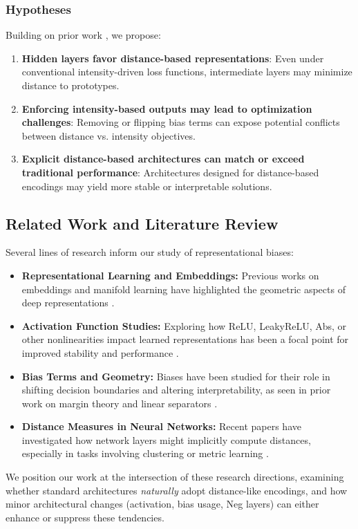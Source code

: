 \documentclass{article}
\begin{document}
\subsubsection{Hypotheses}
Building on prior work \cite{oursland2024,bishop2006pattern}, we propose:
\begin{enumerate}
    \item \textbf{Hidden layers favor distance-based representations}: Even under conventional intensity-driven loss functions, intermediate layers may minimize distance to prototypes.
    \item \textbf{Enforcing intensity-based outputs may lead to optimization challenges}: Removing or flipping bias terms can expose potential conflicts between distance vs. intensity objectives.
    \item \textbf{Explicit distance-based architectures can match or exceed traditional performance}: Architectures designed for distance-based encodings may yield more stable or interpretable solutions.
\end{enumerate}

\subsection{Related Work and Literature Review}
Several lines of research inform our study of representational biases:
\begin{itemize}
    \item \textbf{Representational Learning and Embeddings:} Previous works on embeddings and manifold learning have highlighted the geometric aspects of deep representations \cite{bishop2006pattern, jolliffe2002pca}. 
    \item \textbf{Activation Function Studies:} Exploring how ReLU, LeakyReLU, Abs, or other nonlinearities impact learned representations has been a focal point for improved stability and performance \cite{nair2010rectified}.
    \item \textbf{Bias Terms and Geometry:} Biases have been studied for their role in shifting decision boundaries and altering interpretability, as seen in prior work on margin theory and linear separators \cite{lipton2018mythos}.
    \item \textbf{Distance Measures in Neural Networks:} Recent papers have investigated how network layers might implicitly compute distances, especially in tasks involving clustering or metric learning \cite{oursland2024}.
\end{itemize}
We position our work at the intersection of these research directions, examining whether standard architectures \emph{naturally} adopt distance-like encodings, and how minor architectural changes (activation, bias usage, Neg layers) can either enhance or suppress these tendencies.
\end{document}
